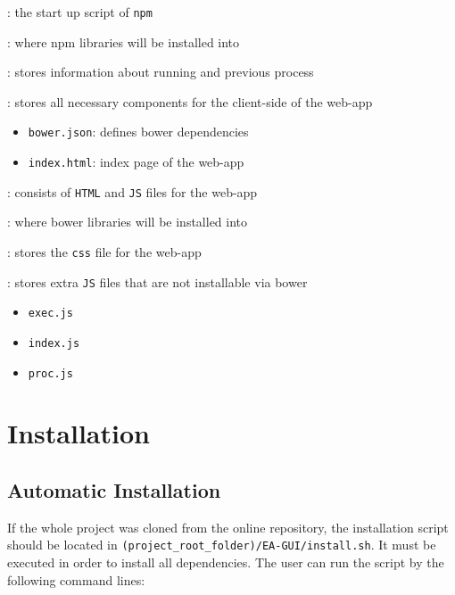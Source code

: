 \documentclass[11pt,a4paper]{article}
\begin{document}
: the start up script of \texttt{npm}


: where npm libraries will be installed into

: stores information about running and previous process

: stores all necessary components for the client-side of the web-app
\begin{itemize}
\item \texttt{bower.json}: defines bower dependencies
\item \texttt{index.html}: index page of the web-app
\end{itemize}
: consists of \texttt{HTML} and \texttt{JS} files for the web-app

: where bower libraries will be installed into

: stores the \texttt{css} file for the web-app


: stores extra \texttt{JS} files that are not installable via bower

\begin{itemize}
\item \texttt{exec.js}
\item \texttt{index.js}
\item \texttt{proc.js}
\end{itemize}

\section{Installation}
\subsection{Automatic Installation}

If the whole project was cloned from the online repository, the installation script should be located in \texttt{(project\_root\_folder)/EA-GUI/install.sh}. It must be executed in order to install all dependencies. The user can run the script by the following command lines:
\end{document}
